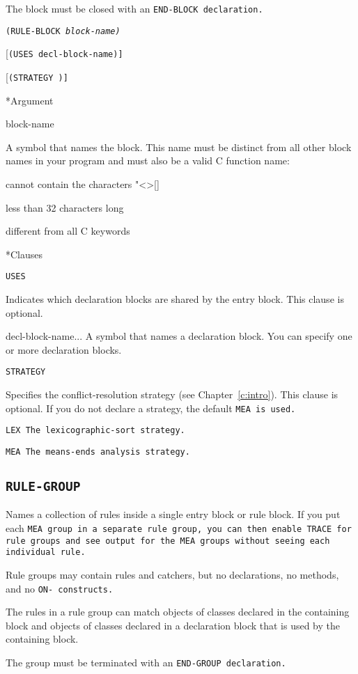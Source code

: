 {{The block must be closed with an \tt{END-BLOCK} declaration.

\Format

\tt{(RULE-BLOCK} \it{block-name}\tt)

[\tt{(USES} \tt{decl-block-name}\tt)]

[\tt{(STRATEGY} \tt{)}]

*Argument

block-name

A symbol that names the block. This name must be distinct
from all other block names in your program and must also be a
valid C function name:

cannot contain the characters "<>[]%

less than 32 characters long

different from all C keywords

*Clauses

\tt{USES}

Indicates which declaration blocks are shared by the entry block. This
clause is optional.

decl-block-name...  A symbol that names a declaration block.  You can
specify one or more declaration blocks.

\tt{STRATEGY}

Specifies the conflict-resolution strategy (see
Chapter~\ref{c:intro}).  This clause is optional. If you do not
declare a strategy, the default \tt{MEA} is used.

\tt{LEX}  The lexicographic-sort strategy.

\tt{MEA}  The means-ends analysis strategy.

\subsection{\tt{RULE-GROUP}}

Names a collection of rules inside a single entry block or
rule block. If you put each \tt{MEA} group in a separate rule
group, you can then enable \tt{TRACE} for rule groups and see
output for the \tt{MEA} groups without seeing each individual
rule.

Rule groups may contain rules and catchers, but no
declarations, no methods, and no \tt{ON-} constructs.

The rules in a rule group can match objects of classes declared in the
containing block and objects of classes declared in a declaration
block that is used by the containing block.

The group must be terminated with an \tt{END-GROUP} declaration.

}}
